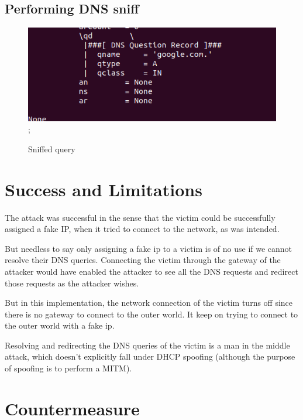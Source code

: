 \documentclass[12pt]{article}
\begin{document}
\begin{sloppypar}
\subsection{Performing DNS sniff}

 

\newpage
    \begin{figure}[h]
    \centering
    \includegraphics[width=9 cm,height=3 cm]{images/sniff-1.png};
    \caption{Sniffed query}
    \end{figure}
\end{sloppypar}


 \section{Success and Limitations}
\begin{sloppypar}

The attack was successful in the sense that the victim could be successfully assigned a fake IP, when it tried to connect to the network, as was intended.

But needless to say only assigning a fake ip to a victim is of no use if we cannot resolve their DNS queries. Connecting the victim through the gateway of the attacker would have enabled the attacker to see all the DNS requests and redirect those requests as the attacker wishes.

But in this implementation, the network connection of the victim turns off since there is no gateway to connect to the outer world. It keep on trying to connect to the outer world with a fake ip. 

Resolving and redirecting the DNS queries of the victim is a man in the middle attack, which doesn't explicitly fall under DHCP spoofing (although the purpose of spoofing is to perform a MITM).

\end{sloppypar}


\section{Countermeasure}
\end{document}
